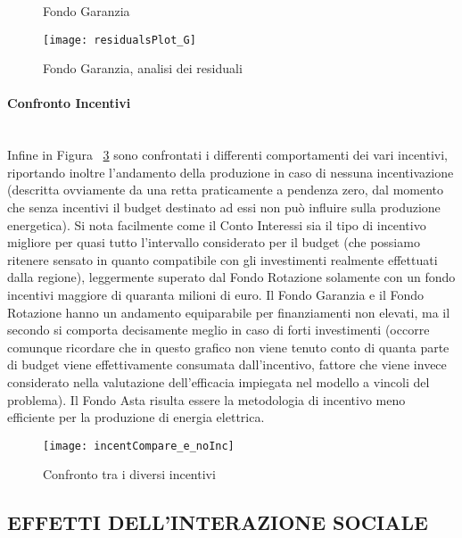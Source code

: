 \documentclass[12pt,a4paper,openright,twoside]{report}
\newcommand{\myparagraph}[1]{\paragraph{#1}\mbox{}\\}
\begin{document}
\begin{figure}[H]
	\centering
	\qquad
	\caption{Fondo Garanzia}
	\label{graphSimG}
\end{figure}

\begin{figure}[hbt]
	\centering
	\texttt{[image: residualsPlot\_G]}
	\caption{Fondo Garanzia, analisi dei residuali}
	\label{residualsPlot_G}
\end{figure}

\myparagraph{Confronto Incentivi}

Infine in Figura ~\ref{incentCompare} sono confrontati i differenti comportamenti dei vari incentivi, riportando inoltre l'andamento della produzione in caso di nessuna incentivazione (descritta ovviamente da una retta praticamente a pendenza zero, dal momento che senza incentivi il budget destinato ad essi non può influire sulla produzione energetica). Si nota facilmente come il Conto Interessi sia il tipo di incentivo migliore per quasi tutto l'intervallo considerato per il budget (che possiamo ritenere sensato in quanto compatibile con gli investimenti realmente effettuati dalla regione), leggermente superato dal Fondo Rotazione solamente con un fondo incentivi maggiore di quaranta milioni di euro. Il Fondo Garanzia e il Fondo Rotazione hanno un andamento equiparabile per finanziamenti non elevati, ma il secondo si comporta decisamente meglio in caso di forti investimenti (occorre comunque ricordare che in questo grafico non viene tenuto conto di quanta parte di budget viene effettivamente consumata dall'incentivo, fattore che viene invece considerato nella valutazione dell'efficacia impiegata nel modello a vincoli del problema). Il Fondo Asta risulta essere la metodologia di incentivo meno efficiente per la produzione di energia elettrica.

\begin{figure}[hbt]
	\centering
	\texttt{[image: incentCompare\_e\_noInc]}
	\caption{Confronto tra i diversi incentivi}
	\label{incentCompare}
\end{figure}

\subsection{EFFETTI DELL'INTERAZIONE SOCIALE}
\end{document}
